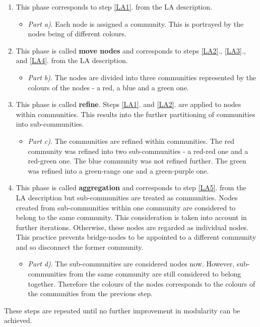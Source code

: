 \begin{enumerate}[label=\alph*)]
  \label{leidenAlgorithmPrinciple}
  \item This phase corresponds to step \ref{LA1}. from the LA description. 
  \begin{itemize}
    \item \textit{Part a)}. Each node is assigned a community. This is portrayed by the nodes being of different colours.
  \end{itemize} 
    \label{LeAa}
  \item This phase is called \textbf{move nodes} and corresponds to steps \ref{LA2}., \ref{LA3}., and \ref{LA4}. from the LA description. 
  \begin{itemize}
    \item \textit{Part b)}. The nodes are divided into three communities represented by the colours of the nodes - a red, a blue and a green one. 
  \end{itemize} 
    \label{LeAb}
  \item This phase is called \textbf{refine}. Steps \ref{LA1}. and \ref{LA2}. are applied to nodes within communities. This results into the further partitioning of communities into sub-communities.
  \begin{itemize}
    \item \textit{Part c)}. The communities are refined within communities. The red community was refined into two sub-communities - a red-red one and a red-green one. The blue community was not refined further. The green was refined into a green-range one and a green-purple one. 
  \end{itemize} 
    \label{LeAc}
  \item This phase is called \textbf{aggregation} and corresponds to step \ref{LA5}. from the LA description but sub-communities are treated as communities. Nodes created from sub-communities within one community are considered to belong to the same community. This consideration is taken into account in further iterations. Otherwise, these nodes are regarded as individual nodes. This practice prevents bridge-nodes to be appointed to a different community and so disconnect the former community.
  \begin{itemize}
    \item \textit{Part d)}. The sub-communities are considered nodes now. However, sub-communities from the same community are still considered to belong together. Therefore the colours of the nodes corresponds to the colours of the communities from the previous step. 
  \end{itemize} 
    \label{LeAd}
\end{enumerate}
These steps are repeated until no further improvement in modularity can be achieved. 

